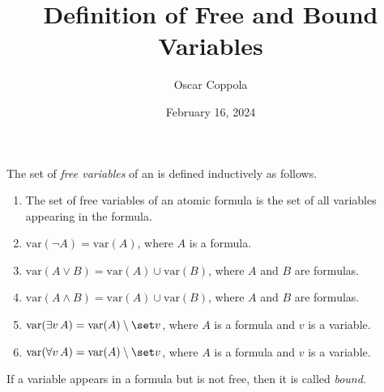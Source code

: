 \documentclass[a4paper]{article}
\title{Definition of Free and Bound Variables}
\date{February 16, 2024}
\author{Oscar Coppola}
\begin{document}
\maketitle
\par{
    The set of \emph{free variables} of an  is defined inductively as follows.
    \begin{enumerate}
\item{
            The set of free variables of an atomic formula is the set of all variables appearing in the formula.
        }
        \item{\(\mathrm {var}( \neg  A) =  \mathrm {var}(A)\), where \(A\) is a formula.
        }
        \item{\(\mathrm {var}(A \lor  B) =  \mathrm {var}(A) \cup \mathrm {var}(B)\), where \(A\) and \(B\) are formulas.
        }
        \item{\(\mathrm {var}(A \land  B) =  \mathrm {var}(A) \cup \mathrm {var}(B)\), where \(A\) and \(B\) are formulas.
        }
        \item{\(\mathrm {var}( \exists  v \, A) =  \mathrm {var}(A) \setminus \set  v\), where \(A\) is a formula and \(v\) is a variable.
        }
        \item{\(\mathrm {var}( \forall  v \, A) =  \mathrm {var}(A) \setminus \set  v\), where \(A\) is a formula and \(v\) is a variable.
        }
\end{enumerate}}\par{
    If a variable appears in a formula but is not free, then it is called \emph{bound}.
}
\printbibliography
\end{document}
